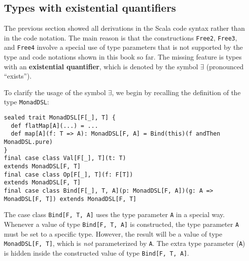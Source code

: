 \subsection{Types with existential quantifiers}

The previous section showed all derivations in the Scala code syntax
rather than in the code notation. The main reason is that the constructions
\lstinline!Free2!, \lstinline!Free3!,
and \lstinline!Free4! involve
a special use of type parameters that is not supported by the type
and code notations shown in this book so far. The missing feature
is types with an \textbf{existential quantifier},
which is denoted by the symbol $\exists$ (pronounced \textsf{``}exists\textsf{''}).

To clarify the usage of the symbol $\exists$, we begin by recalling
the definition of the type \lstinline!MonadDSL!:
\begin{lstlisting}
sealed trait MonadDSL[F[_], T] {
  def flatMap[A](...) = ...
  def map[A](f: T => A): MonadDSL[F, A] = Bind(this)(f andThen MonadDSL.pure)
}
final case class Val[F[_], T](t: T)                                          extends MonadDSL[F, T]
final case class Op[F[_], T](f: F[T])                                        extends MonadDSL[F, T]
final case class Bind[F[_], T, A](p: MonadDSL[F, A])(g: A => MonadDSL[F, T]) extends MonadDSL[F, T]
\end{lstlisting}
The case class \lstinline!Bind[F, T, A]!
uses the type parameter \lstinline!A!
in a special way. Whenever a value of type \lstinline!Bind[F, T, A]!
is constructed, the type parameter \lstinline!A!
must be set to a specific type. However, the result will be a value
of type \lstinline!MonadDSL[F, T]!,
which is \emph{not} parameterized by \lstinline!A!.
The extra type parameter (\lstinline!A!)
is hidden inside the constructed value of type \lstinline!Bind[F, T, A]!.

